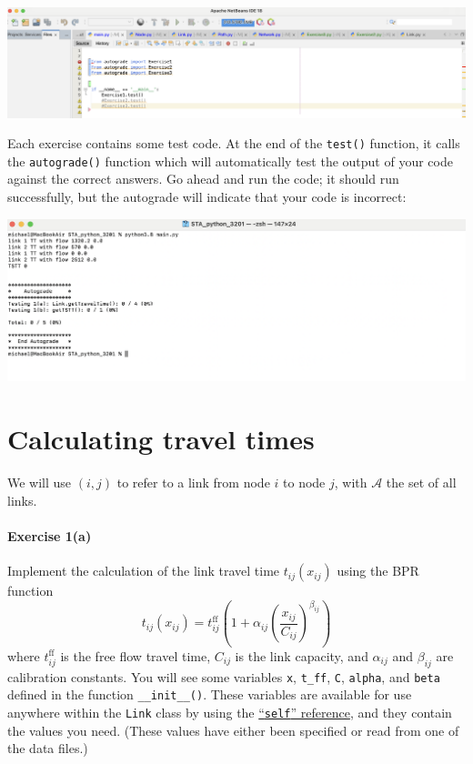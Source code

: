 \documentclass[11pt]{article}
\newcommand{\A}{\mathcal{A}}
\newcommand{\tff}{t^{\mathrm{ff}}_{ij}}
\begin{document}
	\begin{center}
		\includegraphics[width=\textwidth]{netbeans1.png}
	\end{center}
	
	Each exercise contains some test code. At the end of the \texttt{test()} function, it calls the \texttt{autograde()} function which will automatically test the output of your code against the correct answers. Go ahead and run the code; it should run successfully, but the autograde will indicate that your code is incorrect:
	
	\begin{center}
		\includegraphics[width=\textwidth]{netbeans1a.png}
	\end{center}
	

\section{Calculating travel times}

We will use $(i,j)$ to refer to a link from node $i$ to node $j$, with $\A$ the set of all links. 

\paragraph*{Exercise 1(a)} Implement the calculation of the link travel time $t_{ij}(x_{ij})$ using the BPR function 
\begin{equation}
	t_{ij}(x_{ij}) = \tff \left(1+\alpha_{ij} \left(\frac{x_{ij}}{C_{ij}}\right)^{\beta_{ij}}\right) \label{bpr}
\end{equation}
 where $\tff$ is the free flow travel time, $C_{ij}$ is the link capacity, and $\alpha_{ij}$ and $\beta_{ij}$ are calibration constants.
You will see some variables \texttt{x}, \texttt{t\_ff}, \texttt{C}, \texttt{alpha}, and \texttt{beta} defined in the function \texttt{\_\_init\_\_()}. These variables are available for use anywhere within the \texttt{Link} class by using the \href{https://www.w3schools.com/python/gloss_python_self.asp}{``\texttt{self}'' reference}, and they contain the values you need. (These values have either been specified or read from one of the data files.)
\end{document}
